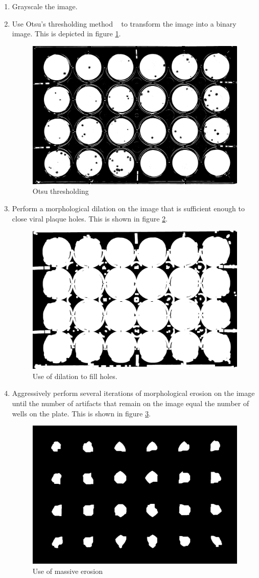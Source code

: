\documentclass[11pt,final,twocolumn]{IEEEtran}
\begin{document}
\begin{enumerate}
\item Grayscale the image.
\item Use Otsu's thresholding method ~\cite{otsu} to transform the image into a binary image. This is depicted in figure \ref{fig:segOtsu}.
\begin{figure}[H]
\centering
\includegraphics[width=.4\textwidth]{segmentOtsu.jpg}
\caption{Otsu thresholding}
\label{fig:segOtsu}
\end{figure}


\item
Perform a morphological dilation on the image that is sufficient enough to close viral plaque holes. This is shown in figure \ref{fig:segFillHoles}.
\begin{figure}[H]
\centering
\includegraphics[width=.4\textwidth]{segmentFillHoles.jpg}
\caption{Use of dilation to fill holes.}
\label{fig:segFillHoles}
\end{figure}



\item
Aggressively perform several iterations of morphological erosion on the image until the number of artifacts that remain on the image equal the number of wells on the plate. This is shown in figure \ref{fig:segErode}.
\begin{figure}[H]
\centering
\includegraphics[width=.4\textwidth]{segmentErode.jpg}
\caption{Use of massive erosion}
\label{fig:segErode}
\end{figure}



\end{enumerate}
\end{document}
